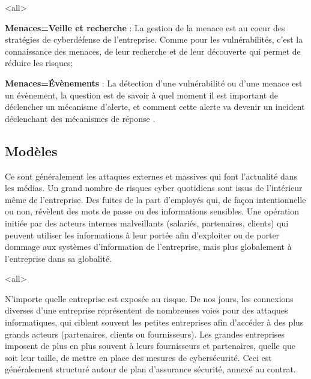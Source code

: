 \mode<all>{
{
\begin{description}
	\item \textbf{Menaces=Veille et recherche} : La gestion de la menace est au coeur des stratégies de cyberdéfense de l'entreprise. Comme pour les vulnérabilités, c'est la connaissance des menaces, de leur recherche et de leur découverte qui permet de réduire les risques;
\item  \textbf{Menaces=Évènements} : La détection d'une vulnérabilité ou d'une menace est un évènement, la question est de savoir à quel moment il est important de déclencher un mécanisme d'alerte, et comment cette alerte va devenir un incident déclenchant des mécanismes de réponse .
\end{description}
}}


\subsection{Modèles}

Ce sont généralement les attaques externes et massives qui font l’actualité dans les médias. 
Un grand nombre de risques cyber quotidiens sont issus de l'intérieur même de l'entreprise.
Des  fuites de la part d'employés qui, de façon intentionnelle ou non, révèlent des mots de passe ou des informations sensibles. Une opération initiée par des acteurs internes malveillants (salariés, partenaires, clients) qui peuvent utiliser les informations à leur portée afin d’exploiter ou de porter dommage aux systèmes d'information de l’entreprise, mais plus globalement à l'entreprise dans sa globalité.

\mode<all>{}

N’importe quelle entreprise est exposée au risque. De nos jours, les connexions diverses d’une entreprise représentent de nombreuses voies pour des attaques informatiques, qui ciblent souvent les petites entreprises afin d’accéder à des plus grands acteurs (partenaires,  clients ou fournisseurs). Les grandes entreprises imposent de plus en plus  souvent à leurs fournisseurs et partenaires, quelle que soit leur taille, de mettre en place des mesures de cybersécurité. Ceci est généralement structuré autour de plan d'assurance sécurité, annexé au contrat.

